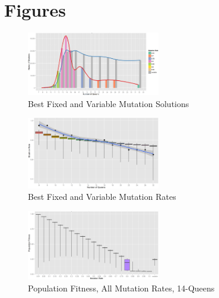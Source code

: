 \documentclass{sig-alternate}
\begin{document}
\section{Figures}
\begin{figure}[!h]
\centering
\includegraphics[width=0.52\textwidth]{best_solution_all_queens.png}
\vspace{-18pt}
\caption{Best Fixed and Variable Mutation Solutions}
\label{fig:best_solution_all_queens}
\end{figure}

\begin{figure}[!h]
\centering
\includegraphics[width=0.52\textwidth]{mutation_rate_all_queens.png}
\vspace{-18pt}
\caption{Best Fixed and Variable Mutation Rates}
\label{fig:mutation_rate_all_queens}
\end{figure}

\begin{figure}[!h]
\centering
\includegraphics[width=0.52\textwidth]{fitness_all_mutation_14q.png}
\vspace{-18pt}
\caption{Population Fitness, All Mutation Rates, 14-Queens}
\label{fig:fitness_all_mutation_14}
\end{figure}
\end{document}
